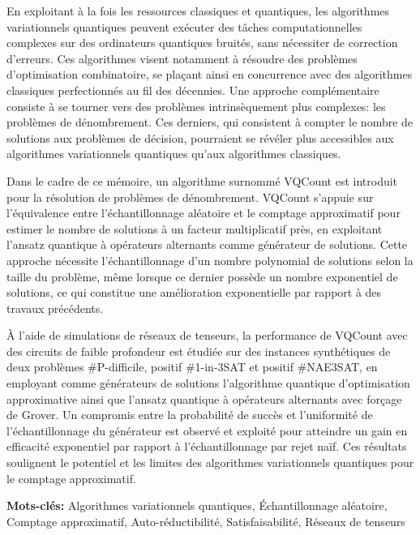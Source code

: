 En exploitant à la fois les ressources classiques et quantiques, les algorithmes variationnels quantiques peuvent exécuter des tâches computationnelles complexes sur des ordinateurs quantiques bruités, sans nécessiter de correction d'erreurs. Ces algorithmes visent notamment à résoudre des problèmes d'optimisation combinatoire, se plaçant ainsi en concurrence avec des algorithmes classiques perfectionnés au fil des décennies. Une approche complémentaire consiste à se tourner vers des problèmes intrinsèquement plus complexes: les problèmes de dénombrement. Ces derniers, qui consistent à compter le nombre de solutions aux problèmes de décision, pourraient se révéler plus accessibles aux algorithmes variationnels quantiques qu'aux algorithmes classiques.

Dans le cadre de ce mémoire, un algorithme surnommé VQCount est introduit pour la résolution de problèmes de dénombrement. VQCount s'appuie sur l'équivalence entre l'échantillonnage aléatoire et le comptage approximatif pour estimer le nombre de solutions à un facteur multiplicatif près, en exploitant l'ansatz quantique à opérateurs alternants comme générateur de solutions. Cette approche nécessite l'échantillonnage d'un nombre polynomial de solutions selon la taille du problème, même lorsque ce dernier possède un nombre exponentiel de solutions, ce qui constitue une amélioration exponentielle par rapport à des travaux précédents.

À l'aide de simulations de réseaux de tenseurs, la performance de VQCount avec des circuits de faible profondeur est étudiée sur des instances synthétiques de deux problèmes \textsf{\#P}-difficile, positif \#1-in-3SAT et positif \#NAE3SAT, en employant comme générateurs de solutions l'algorithme quantique d'optimisation approximative ainsi que l'ansatz quantique à opérateurs alternants avec forçage de Grover. Un compromis entre la probabilité de succès et l'uniformité de l'échantillonnage du générateur est observé et exploité pour atteindre un gain en efficacité exponentiel par rapport à l'échantillonnage par rejet naïf. Ces résultats soulignent le potentiel et les limites des algorithmes variationnels quantiques pour le comptage approximatif.

\noindent
\textbf{Mots-clés:} Algorithmes variationnels quantiques, Échantillonnage aléatoire, Comptage approximatif, Auto-réductibilité, Satisfaisabilité, Réseaux de tenseurs